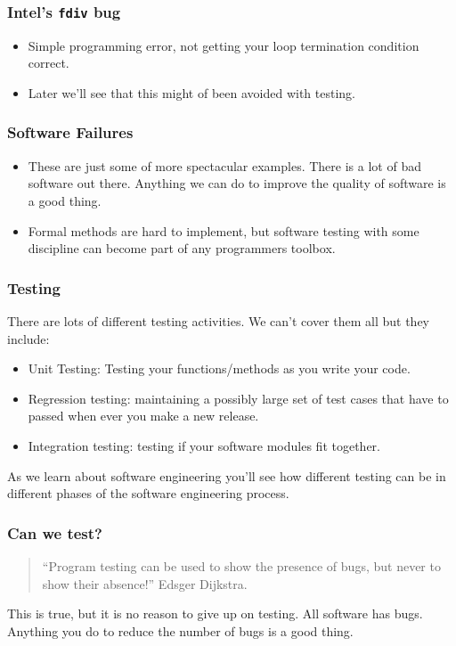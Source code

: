 \documentclass{beamer}
\begin{document}
\begin{frame}
  \frametitle{Intel's {\tt fdiv} bug}
  \begin{itemize}
  \item Simple programming error, not getting your loop termination
    condition correct.
  \item Later we'll see that this might of been avoided with testing.
  \end{itemize}
\end{frame}
\begin{frame}
  \frametitle{Software Failures}
  \begin{itemize}
  \item These are just some of more spectacular examples. There is
    a lot of bad software out there. Anything we can do to
    improve the quality of software is a good thing. 
  \item  Formal methods are hard to implement, but
    software testing with some discipline can become part of any
    programmers toolbox.
  \end{itemize}
\end{frame}
\begin{frame}
  \frametitle{Testing}
  There are lots of different testing activities. We can't cover them
  all but they include:
  \begin{itemize}
  \item Unit Testing: Testing your functions/methods as you write your
    code.
  \item Regression testing: maintaining a possibly large set of test
    cases that have to passed when ever you make a new release.
  \item Integration testing: testing  if your software modules fit
    together. 
  \end{itemize}
As we learn about software engineering you'll see how different
testing can be in different phases of the software engineering
process. 
\end{frame}
\begin{frame}
  \frametitle{Can we test?}
  
  \begin{quote}
    ``Program testing can be used to show the presence of bugs, but
    never to show their absence!'' Edsger Dijkstra.
  \end{quote}


This is true, but it is no reason to give up on testing. All software has
bugs. Anything you do to reduce the number of bugs is a good thing.
\end{frame}
\end{document}
